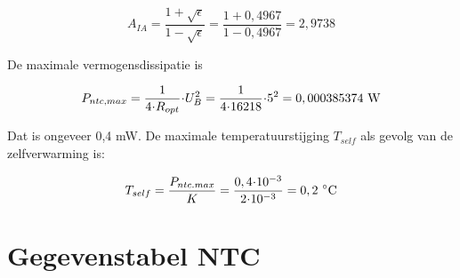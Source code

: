 \documentclass[12pt,a4paper,final,twoside,fleqn]{article}
\newcommand{\rntc}{R_\text{NTC}}
\newcommand{\ropt}{R_{opt}}
\let\oldcdot\cdot
\renewcommand{\cdot}{\kern-.10em\oldcdot\kern-.10em}
\begin{document}
\begin{equation}
A_{IA} = \dfrac{1+\sqrt{\epsilon}}{1-\sqrt{\epsilon}} = 
         \dfrac{1+0,4967}{1-0,4967} = 2,9738
\end{equation}

De maximale vermogensdissipatie is

\begin{equation}
P_{ntc,max} = \dfrac{1}{4\cdot \ropt}\cdot U_B^2 = \dfrac{1}{4\cdot 16218}\cdot 5^2 =
0,000385374\ \text{W}
\end{equation}

Dat is ongeveer 0,4 mW. De maximale temperatuurstijging $T_{self}$ als gevolg van de
 zelfverwarming is:
 
\begin{equation}
T_{self} = \dfrac{P_{ntc.max}}{K} = \dfrac{0,4\cdot10^{-3}}{2\cdot10^{-3}}=0,2\ ^\circ\text{C}
\end{equation}


\appendix

\clearpage
\section{Gegevenstabel NTC}
\end{document}
